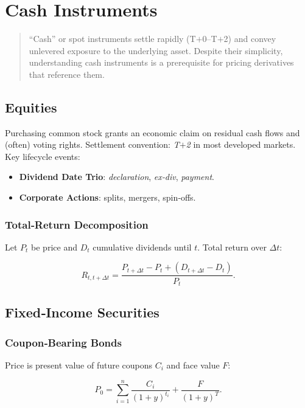 \chapter{Cash Instruments}\label{ch:cash}

\begin{abstract}
“Cash” or spot instruments settle rapidly (T\(+\)0–T\(+\)2) and convey
unlevered exposure to the underlying asset.  
Despite their simplicity, understanding cash instruments is a prerequisite for
pricing derivatives that reference them.
\end{abstract}

\section{Equities}

Purchasing common stock grants an economic claim on residual cash flows
and (often) voting rights.  Settlement convention: \emph{T\(+\)2} in most
developed markets.  Key lifecycle events:

\begin{itemize}
  \item \textbf{Dividend Date Trio}: \emph{declaration}, \emph{ex‑div}, \emph{payment}.
  \item \textbf{Corporate Actions}: splits, mergers, spin‑offs.
\end{itemize}

\subsection{Total‑Return Decomposition}

Let \(P_t\) be price and \(D_t\) cumulative dividends until \(t\).  
Total return over \(\Delta t\):

\[
R_{t,t+\Delta t} = \frac{P_{t+\Delta t}-P_t + (D_{t+\Delta t}-D_t)}{P_t}.
\]

\section{Fixed‑Income Securities}

\subsection{Coupon‑Bearing Bonds}

Price is present value of future coupons \(C_i\) and face value \(F\):

\[
P_0 = \sum_{i=1}^{n} \frac{C_i}{(1+y)^{t_i}} + \frac{F}{(1+y)^{T}} .
\]

